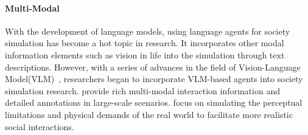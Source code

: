 \paragraph{Multi-Modal} With the development of language models, using language agents for society simulation has become a hot topic in research. It incorporates other modal information elements such as vision in life into the simulation through text descriptions. However, with a series of advances in the field of Vision-Language Model(VLM)~\cite{Radford2021, liu2024visual, achiam2023gpt}, researchers began to incorporate VLM-based agents into society simulation research. \cite{wang2024grutopia} provide rich multi-modal interaction information and detailed annotations in large-scale scenarios. \cite{yu2024mineland} focus on simulating the perceptual limitations and physical demands of the real world to facilitate more realistic social interactions.





